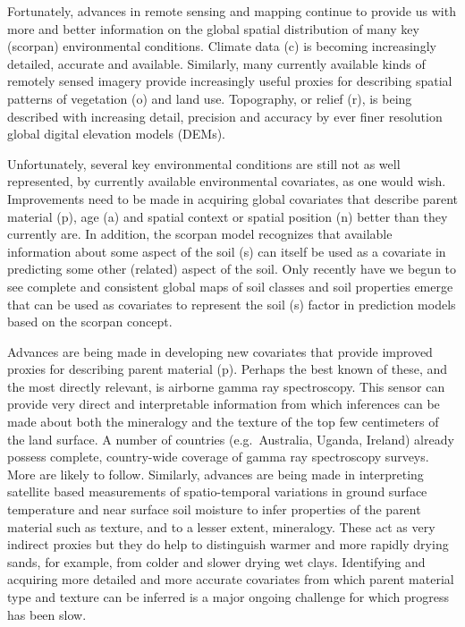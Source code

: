 \documentclass[graybox,natbib,nospthms,UStrade]{svmono}
\begin{document}
Fortunately, advances in remote sensing and mapping continue to provide
us with more and better information on the global spatial distribution
of many key (scorpan) environmental conditions. Climate data (c) is
becoming increasingly detailed, accurate and available. Similarly, many
currently available kinds of remotely sensed imagery provide
increasingly useful proxies for describing spatial patterns of
vegetation (o) and land use. Topography, or relief (r), is being
described with increasing detail, precision and accuracy by ever finer
resolution global digital elevation models (DEMs).

Unfortunately, several key environmental conditions are still not as
well represented, by currently available environmental covariates, as
one would wish. Improvements need to be made in acquiring global
covariates that describe parent material (p), age (a) and spatial
context or spatial position (n) better than they currently are. In
addition, the scorpan model recognizes that available information about
some aspect of the soil (s) can itself be used as a covariate in
predicting some other (related) aspect of the soil. Only recently have
we begun to see complete and consistent global maps of soil classes and
soil properties emerge that can be used as covariates to represent the
soil (s) factor in prediction models based on the scorpan concept.

Advances are being made in developing new covariates that provide
improved proxies for describing parent material (p). Perhaps the best
known of these, and the most directly relevant, is airborne gamma ray
spectroscopy. This sensor can provide very direct and interpretable
information from which inferences can be made about both the mineralogy
and the texture of the top few centimeters of the land surface. A number
of countries (e.g.~Australia, Uganda, Ireland) already possess complete,
country-wide coverage of gamma ray spectroscopy surveys. More are likely
to follow. Similarly, advances are being made in interpreting satellite
based measurements of spatio-temporal variations in ground surface
temperature and near surface soil moisture to infer properties of the
parent material such as texture, and to a lesser extent, mineralogy.
These act as very indirect proxies but they do help to distinguish
warmer and more rapidly drying sands, for example, from colder and
slower drying wet clays. Identifying and acquiring more detailed and
more accurate covariates from which parent material type and texture can
be inferred is a major ongoing challenge for which progress has been
slow.
\end{document}
